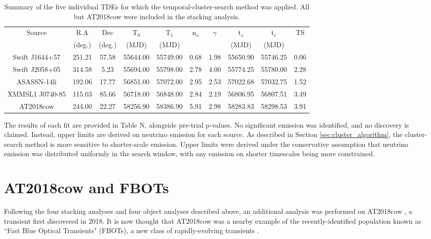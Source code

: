 \begin{table*}[]
	\centering
	\begin{tabular}{||c |c c c c | c c c c| c||} 
	\hline
	Source & R.A & Dec & T$_{0}$ & T$_{1}$ & n$_{s}$ & $\gamma$ & t$_{s}$ & t$_{e}$ & TS\\
	& (deg.) & (deg.) & (MJD) & (MJD) & & & (MJD) & (MJD) & \\
	\hline
	Swift J1644+57 & 251.21 & 57.58 & 55644.00 & 55749.00 & 0.68 & 1.98 & 55650.90 & 55746.25 & 0.06\\
	Swift J2058+05 & 314.58 & 5.23 & 55694.00 & 55798.00 & 2.78 & 4.00 & 55774.25 & 55780.00 & 2.28\\
	ASASSN-14li & 192.06 & 17.77 & 56851.00 & 57072.00 & 2.95 & 2.53 & 57022.68 & 57032.75 & 1.52\\
	XMMSL1 J0740-85 & 115.03 & 85.66 & 56718.00 & 56848.00 & 2.84 & 2.19 & 56806.95 & 56807.51 & 3.49\\
	\hline
	AT2018cow & 244.00 & 22.27 & 58256.90 & 58386.90 & 5.91 & 2.98 & 58283.83 & 58298.53 & 3.91\\
	\hline
	\end{tabular}
	\caption{Summary of the five individual TDEs for which the temporal-cluster-search method was applied. All but AT2018cow were included in the stacking analysis.}
	\label{tab:single_tests}
\end{table*}{}

The results of each fit are provided in Table N, alongside pre-trial p-values. No significant emission was identified, and no discovery is claimed. Instead, upper limits are derived on neutrino emission for each source. As described in Section \ref{sec:cluster_algorithm}, the cluster-search method is more sensitive to shorter-scale emission. Upper limits were derived under the conservative assumption that neutrino emission was distributed uniformly in the search window, with any emission on shorter timescales being more constrained. 

\section{AT2018cow and FBOTs}

Following the four stacking analyses and four object analyses described above, an additional analysis was performed on AT2018cow , a transient first discovered in 2018. It is now thought that AT2018cow was a nearby example of the recently-identified population known as ``Fast Blue Optical Transients" (FBOTs), a new class of rapidly-evolving transients . 

